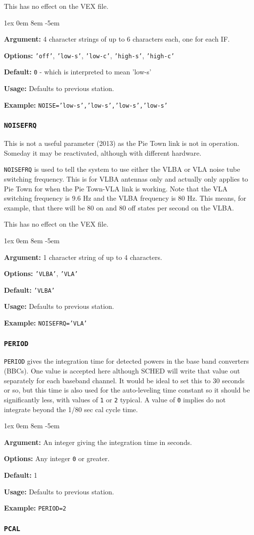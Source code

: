 \documentclass{report}
\newcommand{\rcwbox}[5]{
  \begin{list}{}{\parsep 1ex  \itemsep 0em
                 \leftmargin 8em  \itemindent -5em }
    \item {\bf Argument:} #1
    \item {\bf Options:}  #2
    \item {\bf Default:}  #3
    \item {\bf Usage:}    #4
    \item {\bf Example:}  #5
  \end{list}
}
\begin{document}
This has no effect on the VEX file.

\rcwbox
{4 character strings of up to 6 characters each, one for each IF.}
{{\tt 'off'}, {\tt 'low-s'}, {\tt 'low-c'}, {\tt 'high-s'},
{\tt 'high-c'}}
{{\tt 0} - which is interpreted to mean 'low-s'}
{Defaults to previous station.}
{{\tt NOISE='low-s','low-s','low-s','low-s'}}

\subsubsection{\label{SP:NOISEFRQ}{\tt NOISEFRQ}}

This is not a useful parameter (2013) as the Pie Town link is
not in operation.  Someday it may be reactivated, although with
different hardware.

{\tt NOISEFRQ} is used to tell the system to use either the VLBA or
VLA noise tube switching frequency.  This is for VLBA antennas only
and actually only applies to Pie Town for when the Pie Town-VLA link
is working.  Note that the VLA switching frequency is 9.6 Hz and the
VLBA frequency is 80 Hz.  This means, for example, that there will be
80 on and 80 off states per second on the VLBA.

This has no effect on the VEX file.

\rcwbox
{1 character string of up to 4 characters.}
{{\tt 'VLBA'}, {\tt 'VLA'}}
{{\tt 'VLBA'}}
{Defaults to previous station.}
{{\tt NOISEFRQ='VLA'}}


\subsubsection{\label{SP:PERIOD}{\tt PERIOD}}

{\tt PERIOD} gives the integration time for detected powers in the
base band converters (BBCs). One value is accepted here although {\sc
SCHED} will write that value out separately for each baseband
channel. It would be ideal to set this to 30 seconds or so, but this
time is also used for the auto-leveling time constant so it should be
significantly less, with values of {\tt 1} or {\tt 2} typical. A value
of {\tt 0} implies do not integrate beyond the 1/80 sec cal cycle
time.

\rcwbox
{An integer giving the integration time in seconds.}
{Any integer {\tt 0} or greater.}
{1}
{Defaults to previous station.}
{{\tt PERIOD=2}}


\subsubsection{\label{SP:PCAL}{\tt PCAL}}
\end{document}
